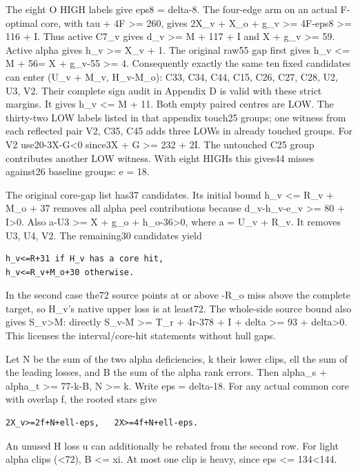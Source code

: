 \documentclass[11pt,a4paper]{article}
\begin{document}
The eight O HIGH labels give eps8 = delta-8. The four-edge arm on an
actual F-optimal core, with tau + 4F \textgreater= 260, gives 2X\_v +
X\_o + g\_v \textgreater= 4F-eps8 \textgreater= 116 + I. Thus active
C7\_v gives d\_v \textgreater= M + 117 + I and X + g\_v \textgreater=
59. Active alpha gives h\_v \textgreater= X\_v + 1. The original raw55
gap first gives h\_v \textless= M + 56= X + g\_v-55 \textgreater= 4.
Consequently exactly the same ten fixed candidates can enter (U\_v +
M\_v, H\_v-M\_o): C33, C34, C44, C15, C26, C27, C28, U2, U3, V2. Their
complete sign audit in Appendix D is valid with these strict margins. It
gives h\_v \textless= M + 11. Both empty paired centres are LOW. The
thirty-two LOW labels listed in that appendix touch25 groups; one
witness from each reflected pair V2, C35, C45 adds three LOWs in already
touched groups. For V2 use20-3X-G\textless0 since3X + G \textgreater=
232 + 2I. The untouched C25 group contributes another LOW witness. With
eight HIGHs this gives44 misses against26 baseline groups: e = 18.

The original core-gap list has37 candidates. Its initial bound h\_v
\textless= R\_v + M\_o + 37 removes all alpha peel contributions because
d\_v-h\_v-e\_v \textgreater= 80 + I\textgreater0. Also a-U3
\textgreater= X + g\_o + h\_o-36\textgreater0, where a = U\_v + R\_v. It
removes U3, U4, V2. The remaining30 candidates yield

\begin{verbatim}
h_v<=R+31 if H_v has a core hit,
h_v<=R_v+M_o+30 otherwise.
\end{verbatim}

In the second case the72 source points at or above -R\_o miss above the
complete target, so H\_v's native upper loss is at least72. The
whole-side source bound also gives S\_v\textgreater M: directly S\_v-M
\textgreater= T\_r + 4r-378 + I + delta \textgreater= 93 +
delta\textgreater0. This licenses the interval/core-hit statements
without hull gaps.

Let N be the sum of the two alpha deficiencies, k their lower clips, ell
the sum of the leading losses, and B the sum of the alpha rank errors.
Then alpha\_s + alpha\_t \textgreater= 77-k-B, N \textgreater= k. Write
eps = delta-18. For any actual common core with overlap f, the rooted
stars give

\begin{verbatim}
2X_v>=2f+N+ell-eps,   2X>=4f+N+ell-eps.
\end{verbatim}

An unused H loss u can additionally be rebated from the second row. For
light alpha clips (\textless72), B \textless= xi. At most one clip is
heavy, since eps \textless= 134\textless144.
\end{document}

